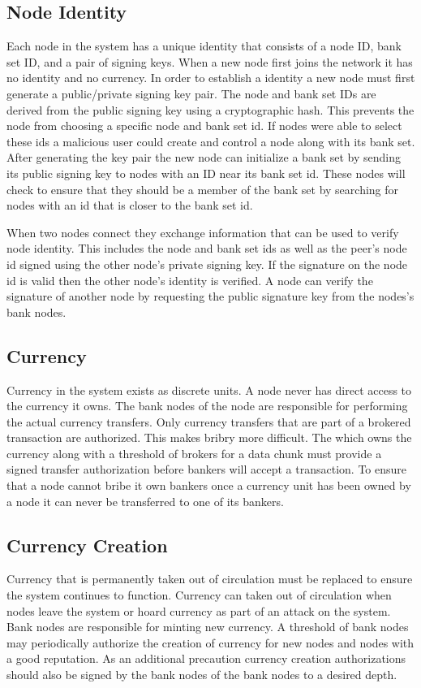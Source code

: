 \documentclass[%
				10pt,
        final,
        notitlepage,
        narroweqnarray,
        inline,
        twoside,
        ]{ieee}
\begin{document}
\subsection{Node Identity}
Each node in the system has a unique identity that consists of a node ID, bank set ID, and a pair of signing keys.  When a new node first joins the network it has no identity and no currency. In order to establish a identity a new node must first generate a public/private signing key pair.  The node and bank set IDs are derived from the public signing key using a cryptographic hash.  This prevents the node from choosing a specific node and bank set id.  If nodes were able to select these ids a malicious user could create and control a node along with its bank set.  After generating the key pair the new node can initialize a bank set by sending its public signing key to nodes with an ID near its bank set id.  These nodes will check to ensure that they should be a member of the bank set by searching for nodes with an id that is closer to the bank set id.  

When two nodes connect they exchange information that can be used to verify node identity.  This includes the node and bank set ids as well as the peer's node id signed using the other node's private signing key.  If the signature on the node id is valid then the other node's identity is verified.  A node can verify the signature of another node by requesting the public signature key from the nodes's bank nodes.

\subsection{Currency}
Currency in the system exists as discrete units.  A node never has direct access to the currency it owns.  The bank nodes of the node are responsible for performing the actual currency transfers.  Only currency transfers that are part of a brokered transaction are authorized. This makes bribry more difficult.  The which owns the currency along with a threshold of brokers for a data chunk must provide a signed transfer authorization before bankers will accept a transaction.  To ensure that a node cannot bribe it own bankers once a currency unit has been owned by a node it can never be transferred to one of its bankers.

\subsection{Currency Creation}
Currency that is permanently taken out of circulation must be replaced to ensure the system continues to function.  Currency can taken out of circulation when nodes leave the system or hoard currency as part of an attack on the system.  Bank nodes are responsible for minting new currency.  A threshold of bank nodes may periodically authorize the creation of currency for new nodes and nodes with a good reputation. As an additional precaution currency creation authorizations should also be signed by the bank nodes of the bank nodes to a desired depth.
\end{document}
